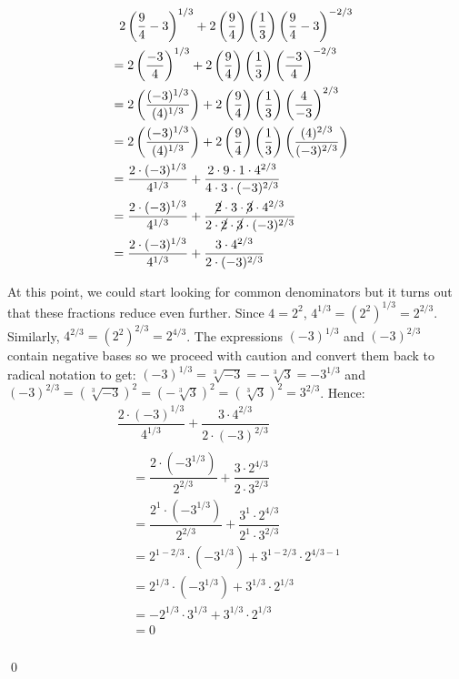\begin{ex}
\begin{enumerate}
\begin{multline*}
2 \left(\dfrac{9}{4} - 3\right)^{1/3} + 2\left(\dfrac{9}{4}\right)\left(\dfrac{1}{3}\right)\left(\dfrac{9}{4}-3\right)^{-2/3} \\
\begin{aligned}
& = 2 \left(\dfrac{-3}{4} \right)^{1/3} + 2\left(\dfrac{9}{4}\right)\left(\dfrac{1}{3}\right)\left(\dfrac{-3}{4}\right)^{-2/3} & \\
& = 2 \left(\dfrac{(-3)^{1/3}}{(4)^{1/3}} \right) + 2\left(\dfrac{9}{4}\right)\left(\dfrac{1}{3}\right)\left(\dfrac{4}{-3}\right)^{2/3} & \\
& = 2 \left(\dfrac{(-3)^{1/3}}{(4)^{1/3}} \right) + 2\left(\dfrac{9}{4}\right)\left(\dfrac{1}{3}\right)\left(\dfrac{(4)^{2/3}}{(-3)^{2/3}}\right) & \\
& = \dfrac{2 \cdot (-3)^{1/3}}{4^{1/3}} + \dfrac{2 \cdot 9 \cdot 1 \cdot 4^{2/3}}{4 \cdot 3 \cdot (-3)^{2/3}} & \\
& = \dfrac{2 \cdot (-3)^{1/3}}{4^{1/3}} + \dfrac{\cancel{2} \cdot 3 \cdot \cancel{3} \cdot 4^{2/3}}{2 \cdot \cancel{2} \cdot \cancel{3} \cdot (-3)^{2/3}} & \\
& = \dfrac{2 \cdot (-3)^{1/3}}{4^{1/3}} + \dfrac{3 \cdot 4^{2/3}}{2 \cdot (-3)^{2/3}} & \\
\end{aligned}
\end{multline*}

At this point, we could start looking for common denominators but it turns out that these fractions reduce even further.  Since $4 = 2^2$, $4^{1/3} = (2^2)^{1/3} = 2^{2/3}$.  Similarly, $4^{2/3} = (2^2)^{2/3} = 2^{4/3}$. The expressions $(-3)^{1/3}$ and $(-3)^{2/3}$ contain negative bases so we proceed with caution and convert them back to radical notation to get:  $(-3)^{1/3} = \sqrt[3]{-3} = -\sqrt[3]{3} = - 3^{1/3}$ and  $(-3)^{2/3} = (\sqrt[3]{-3})^2 = (-\sqrt[3]{3})^2 =(\sqrt[3]{3})^2 = 3^{2/3}$.  Hence:
\begin{multline*}
\dfrac{2 \cdot (-3)^{1/3}}{4^{1/3}} + \dfrac{3 \cdot 4^{2/3}}{2 \cdot (-3)^{2/3}} \\
\begin{aligned}
& = \dfrac{2 \cdot (-3^{1/3})}{2^{2/3}} + \dfrac{3 \cdot 2^{4/3}}{2 \cdot 3^{2/3}}  & \\
& = \dfrac{2^{1} \cdot (-3^{1/3})}{2^{2/3}} + \dfrac{3^{1} \cdot 2^{4/3}}{2^{1} \cdot 3^{2/3}}  & \\
& = 2^{1 - 2/3} \cdot (-3^{1/3}) +3^{1- 2/3} \cdot 2^{4/3 - 1}  & \\
& = 2^{1/3} \cdot (-3^{1/3}) +3^{1/3} \cdot 2^{1/3}  & \\ 
& =  - 2^{1/3} \cdot 3^{1/3} +3^{1/3} \cdot 2^{1/3}  & \\ 
& = 0 & \\
\end{aligned}
\end{multline*}

\vspace{-.3in} \qed

\end{enumerate}

\end{ex}

